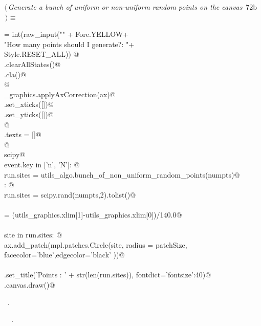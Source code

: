 \documentclass[11.5pt]{report}
\begin{document}
\begin{flushleft} \small\label{scrap106}\raggedright\small
{} $\langle\,${\itshape Generate a bunch of uniform or non-uniform random points on the canvas}\nobreak\ {\footnotesize {72b}}$\,\rangle\equiv$
\vspace{-1ex}
\begin{list}{}{} \item
\mbox{}\verb@numpts = int(raw_input("\n" + Fore.YELLOW+\@\\
\mbox{}\verb@                       "How many points should I generate?: "+\@\\
\mbox{}\verb@                       Style.RESET_ALL)) @\\
\mbox{}\verb@run.clearAllStates()@\\
\mbox{}\verb@ax.cla()@\\
\mbox{}\verb@               @\\
\mbox{}\verb@utils_graphics.applyAxCorrection(ax)@\\
\mbox{}\verb@ax.set_xticks([])@\\
\mbox{}\verb@ax.set_yticks([])@\\
\mbox{}\verb@                @\\
\mbox{}\verb@fig.texts = []@\\
\mbox{}\verb@                 @\\
\mbox{}\verb@import scipy@\\
\mbox{}\verb@if event.key in ['n', 'N']: @\\
\mbox{}\verb@        run.sites = utils_algo.bunch_of_non_uniform_random_points(numpts)@\\
\mbox{}\verb@else : @\\
\mbox{}\verb@        run.sites = scipy.rand(numpts,2).tolist()@\\
\mbox{}\verb@@\\
\mbox{}\verb@patchSize  = (utils_graphics.xlim[1]-utils_graphics.xlim[0])/140.0@\\
\mbox{}\verb@@\\
\mbox{}\verb@for site in run.sites:      @\\
\mbox{}\verb@    ax.add_patch(mpl.patches.Circle(site, radius = patchSize, \@\\
\mbox{}\verb@                 facecolor='blue',edgecolor='black' ))@\\
\mbox{}\verb@@\\
\mbox{}\verb@ax.set_title('Points : ' + str(len(run.sites)), fontdict={'fontsize':40})@\\
\mbox{}\verb@fig.canvas.draw()@\\
\mbox{}\verb@@{\NWsep}
\end{list}
\vspace{-1.5ex}
\footnotesize
\begin{list}{}{\setlength{\itemsep}{-\parsep}\setlength{\itemindent}{-\leftmargin}}
\item \NWtxtMacroRefIn\ .
\item \NWtxtIdentsUsed\nobreak\  \verb@clearAllStates@\nobreak\ .
\item{}
\end{list}
\vspace{4ex}
\end{flushleft}
\end{document}
